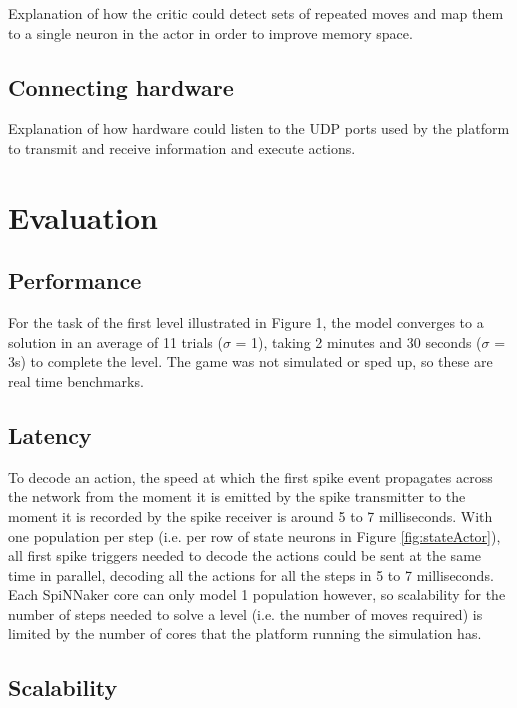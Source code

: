 \documentclass[10pt]{article}
\begin{document}
    Explanation of how the critic could detect sets of repeated moves and map them to a single neuron in the actor in order to improve memory space.
    
    \subsection{Connecting hardware}

    Explanation of how hardware could listen to the UDP ports used by the platform to transmit and receive information and execute actions.

    \section{Evaluation}

    \subsection{Performance}

    For the task of the first level illustrated in Figure 1, the model converges to a solution in an average of 11 trials ($\sigma$ = 1), taking 2 minutes and 30 seconds ($\sigma$ = 3s) to complete the level. The game was not simulated or sped up, so these are real time benchmarks.

    \subsection{Latency}

    To decode an action, the speed at which the first spike event propagates across the network from the moment it is emitted by the spike transmitter to the moment it is recorded by the spike receiver is around 5 to 7 milliseconds. With one population per step (i.e. per row of state neurons in Figure \ref{fig:stateActor}), all first spike triggers needed to decode the actions could be sent at the same time in parallel, decoding all the actions for all the steps in 5 to 7 milliseconds. Each SpiNNaker core can only model 1 population however, so scalability for the number of steps needed to solve a level (i.e. the number of moves required) is limited by the number of cores that the platform running the simulation has.

    \subsection{Scalability}
\end{document}

